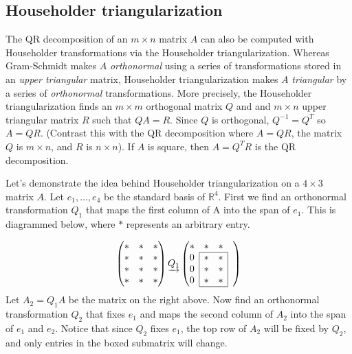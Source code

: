 \subsection*{Householder triangularization}
The QR decomposition of an $m \times n$ matrix $A$ can also be computed with Householder transformations via the Householder triangularization.
Whereas Gram-Schmidt makes $A$ \emph{orthonormal} using a series of transformations stored in an \emph{upper triangular} matrix, Householder triangularization makes $A$ \emph{triangular} by a series of \emph{orthonormal} transformations.
More precisely, the Householder triangularization finds an $m \times m$ orthogonal matrix $Q$ and and $m \times n$ upper triangular matrix $R$ such that $QA = R$. 
Since $Q$ is orthogonal, $Q^{-1}=Q^T$ so $A = QR$.
(Contrast this with the QR decomposition where $A = QR$, the matrix $Q$ is $m \times n$, and $R$ is $n \times n$). 
If $A$ is square, then $A = Q^TR$ is the QR decomposition. 

Let's demonstrate the idea behind Householder triangularization on a $4 \times 3$ matrix $A$.
Let $e_1, \ldots, e_4$ be the standard basis of $\mathbb{R}^4$.
First we find an orthonormal transformation $Q_1$ that maps the first column of A into the span of $e_1$. 
This is diagrammed below, where $*$ represents an arbitrary entry.

\def\mc#1{\multicolumn{1}{c|}{#1}}
\def\lc#1{\multicolumn{1}{|c}{#1}}
\begin{equation*}
\begin{pmatrix}
* & * & * \\
* & * & * \\
* & * & * \\
* & * & *
\end{pmatrix}
\underrightarrow{Q_1}
\begin{pmatrix}

* & * & * & \\ \cline{2-3}
\mc{0} & * & \mc{*}& \\
\mc{0} & * & \mc{*} & \\
\mc{0}& * & \mc{*} & \\ \cline{2-3}
\end{pmatrix}
\end{equation*}
Let $A_2 = Q_1A$ be the matrix on the right above.
Now find an orthonormal transformation $Q_2$ that fixes $e_1$ and maps the second column of $A_2$ into the span of $e_1$ and $e_2$. 
Notice that since $Q_2$ fixes $e_1$, the top row of $A_2$ will be fixed by $Q_2$, and only entries in the boxed submatrix will change.

